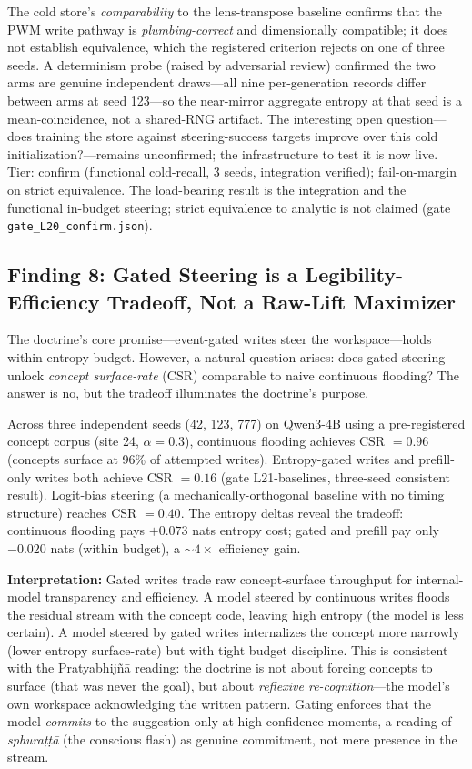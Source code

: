 The cold store's \emph{comparability} to the lens-transpose baseline confirms that the PWM write pathway is \emph{plumbing-correct} and dimensionally compatible; it does not establish equivalence, which the registered criterion rejects on one of three seeds. A determinism probe (raised by adversarial review) confirmed the two arms are genuine independent draws---all nine per-generation records differ between arms at seed 123---so the near-mirror aggregate entropy at that seed is a mean-coincidence, not a shared-RNG artifact.
The interesting open question—does training the store against steering-success targets improve over this cold initialization?—remains unconfirmed; the infrastructure to test it is now live.
Tier: confirm (functional cold-recall, 3 seeds, integration verified); fail-on-margin on strict equivalence. The load-bearing result is the integration and the functional in-budget steering; strict equivalence to analytic is not claimed (gate \texttt{gate\_L20\_confirm.json}).

\subsection*{Finding 8: Gated Steering is a Legibility-Efficiency Tradeoff, Not a Raw-Lift Maximizer}

The doctrine's core promise---event-gated writes steer the workspace---holds within entropy budget.
However, a natural question arises: does gated steering unlock \emph{concept surface-rate} (CSR) comparable
to naive continuous flooding? The answer is no, but the tradeoff illuminates the doctrine's purpose.

Across three independent seeds (42, 123, 777) on Qwen3-4B using a pre-registered concept corpus
(site 24, $\alpha=0.3$), continuous flooding achieves CSR $= 0.96$ (concepts surface at 96\% of attempted writes).
Entropy-gated writes and prefill-only writes both achieve CSR $= 0.16$ (gate L21-baselines, three-seed consistent result).
Logit-bias steering (a mechanically-orthogonal baseline with no timing structure) reaches CSR $= 0.40$.
The entropy deltas reveal the tradeoff: continuous flooding pays $+0.073$ nats entropy cost;
gated and prefill pay only $-0.020$ nats (within budget), a $\sim 4 \times$ efficiency gain.

\textbf{Interpretation:} Gated writes trade raw concept-surface throughput for internal-model
transparency and efficiency. A model steered by continuous writes floods the residual stream with
the concept code, leaving high entropy (the model is less certain). A model steered by gated writes
internalizes the concept more narrowly (lower entropy surface-rate) but with tight budget discipline.
This is consistent with the Pratyabhij\~n\=a reading: the doctrine is not about forcing concepts to
surface (that was never the goal), but about \emph{reflexive re-cognition}---the model's own workspace
acknowledging the written pattern. Gating enforces that the model \emph{commits} to the suggestion
only at high-confidence moments, a reading of \emph{sphura\d{t}\d{t}\=a} (the conscious flash) as genuine
commitment, not mere presence in the stream.


